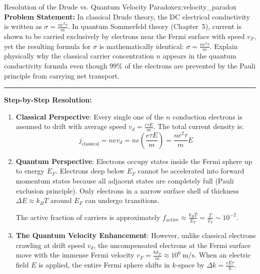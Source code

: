 \documentclass[11pt,a4paper]{article}
\begin{document}
\begin{examplebox}{Resolution of the Drude vs. Quantum Velocity Paradox}{ex:velocity_paradox}
\textbf{Problem Statement:}
In classical Drude theory, the DC electrical conductivity is written as $\sigma = \frac{n e^2 \tau}{m}$. In quantum Sommerfeld theory (Chapter~5), current is shown to be carried exclusively by electrons near the Fermi surface with speed $v_F$, yet the resulting formula for $\sigma$ is mathematically identical: $\sigma = \frac{n e^2 \tau}{m}$. Explain physically why the classical carrier concentration $n$ appears in the quantum conductivity formula even though $99\%$ of the electrons are prevented by the Pauli principle from carrying net transport.

\vspace{0.2cm}\hrule\vspace{0.2cm}
\textbf{Step-by-Step Resolution:}
\begin{enumerate}[leftmargin=*]
    \item \textbf{Classical Perspective}: Every single one of the $n$ conduction electrons is assumed to drift with average speed $v_d = \frac{e\tau E}{m}$. The total current density is:
    \[
    j_{\mathrm{classical}} = n e v_d = n e \left(\frac{e\tau E}{m}\right) = \frac{n e^2 \tau}{m}E
    \]
    \item \textbf{Quantum Perspective}: Electrons occupy states inside the Fermi sphere up to energy $E_F$. Electrons deep below $E_F$ cannot be accelerated into forward momentum states because all adjacent states are completely full (Pauli exclusion principle). Only electrons in a narrow surface shell of thickness $\Delta E \approx k_B T$ around $E_F$ can undergo transitions.
    
    The active fraction of carriers is approximately $f_{\mathrm{active}} \approx \frac{k_B T}{E_F} = \frac{T}{T_F} \sim 10^{-2}$.
    \item \textbf{The Quantum Velocity Enhancement}: However, unlike classical electrons crawling at drift speed $v_d$, the uncompensated electrons at the Fermi surface move with the immense Fermi velocity $v_F = \frac{\hbar k_F}{m} \approx 10^6\ \mathrm{m/s}$. When an electric field $E$ is applied, the entire Fermi sphere shifts in $k$-space by $\Delta k = \frac{e E \tau}{\hbar}$.
    

\end{enumerate}
\end{examplebox}
\end{document}
